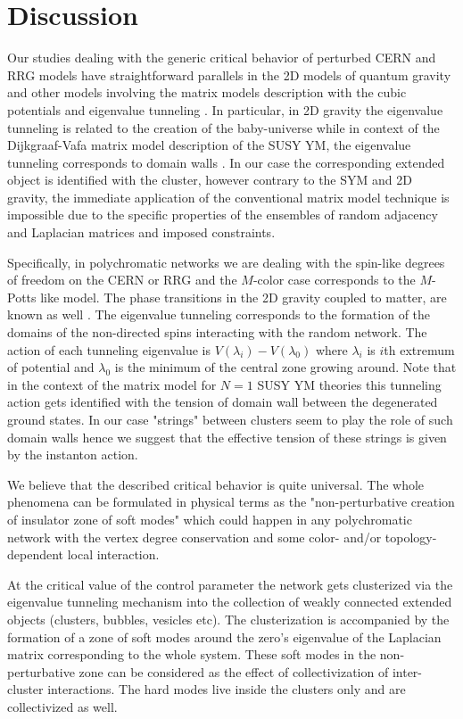 \documentclass[aps,12pt]{revtex4}
\begin{document}
\section{Discussion}

Our studies dealing with the generic critical behavior of perturbed CERN and RRG models have straightforward parallels in the 2D models of quantum gravity and other models involving the matrix models description with the cubic potentials and eigenvalue tunneling
\cite{marino}. In particular, in 2D gravity the eigenvalue tunneling is related to the creation of the baby-universe \cite{ambjorn} while in context of the Dijkgraaf-Vafa matrix model description of the SUSY YM, the eigenvalue tunneling corresponds to domain walls \cite{dv}. In our case the corresponding extended object is identified with the cluster, however contrary to the SYM and 2D gravity,  the immediate application of the conventional matrix model technique is impossible due to the specific properties of the ensembles of  random adjacency and Laplacian matrices and imposed constraints.

Specifically, in polychromatic networks we are dealing with the spin-like degrees of freedom on the CERN or RRG and the $M$-color case corresponds to the $M$-Potts like model. The phase transitions in the 2D gravity coupled to matter, are known as well \cite{kazakov}. The eigenvalue tunneling corresponds to the formation of the domains of the non-directed spins interacting with the random network. The action of each tunneling eigenvalue is $V(\lambda_i) -V(\lambda_0)$ where $\lambda_i$ is $i$th extremum of potential and $\lambda_0$ is the minimum of the central zone growing around. Note that in the context of the matrix model for $N=1$ SUSY YM theories this tunneling action gets identified with the tension of domain wall between the degenerated ground states. In our case "strings" between clusters seem to play the role of such domain walls hence we suggest that the effective tension of these strings is given by the instanton action.

We believe that the described critical behavior is quite universal. The whole phenomena can be formulated in physical terms as the "non-perturbative creation of insulator zone of soft modes" which could happen in any polychromatic network with the vertex degree conservation and some color- and/or topology-dependent local interaction.

At the critical value of the control parameter the network gets clusterized via the eigenvalue tunneling mechanism into the collection of weakly connected extended objects (clusters, bubbles, vesicles etc). The clusterization is accompanied by the formation of a zone of soft modes around the zero's eigenvalue of the Laplacian matrix corresponding to the whole system. These soft modes in the non-perturbative zone can be considered as the effect of collectivization of inter-cluster interactions. The hard modes live inside the clusters only and are collectivized as well.
\end{document}
